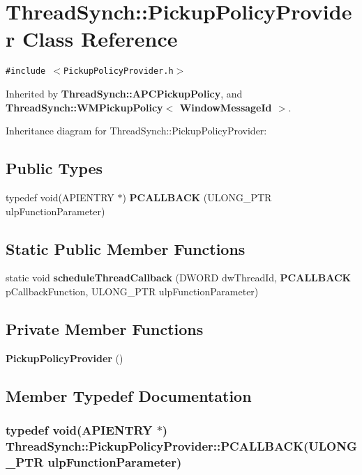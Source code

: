 \section{Thread\-Synch::Pickup\-Policy\-Provider Class Reference}
\label{class_thread_synch_1_1_pickup_policy_provider}
{\tt \#include $<$Pickup\-Policy\-Provider.h$>$}

Inherited by {\bf Thread\-Synch::APCPickup\-Policy}, and {\bf Thread\-Synch::WMPickup\-Policy$<$ Window\-Message\-Id $>$}.

Inheritance diagram for Thread\-Synch::Pickup\-Policy\-Provider:\subsection*{Public Types}
\begin{CompactItemize}
\item 
typedef void(APIENTRY $\ast$) {\bf PCALLBACK} (ULONG\_\-PTR ulp\-Function\-Parameter)
\end{CompactItemize}
\subsection*{Static Public Member Functions}
\begin{CompactItemize}
\item 
static void {\bf schedule\-Thread\-Callback} (DWORD dw\-Thread\-Id, {\bf PCALLBACK} p\-Callback\-Function, ULONG\_\-PTR ulp\-Function\-Parameter)
\end{CompactItemize}
\subsection*{Private Member Functions}
\begin{CompactItemize}
\item 
{\bf Pickup\-Policy\-Provider} ()
\end{CompactItemize}


\subsection{Member Typedef Documentation}
\subsubsection{\setlength{\rightskip}{0pt plus 5cm}typedef void(APIENTRY $\ast$) {\bf Thread\-Synch::Pickup\-Policy\-Provider::PCALLBACK}(ULONG\_\-PTR ulp\-Function\-Parameter)}\label{class_thread_synch_1_1_pickup_policy_provider_d26a2380c2ab02f1a216b2a30073fb9c}




